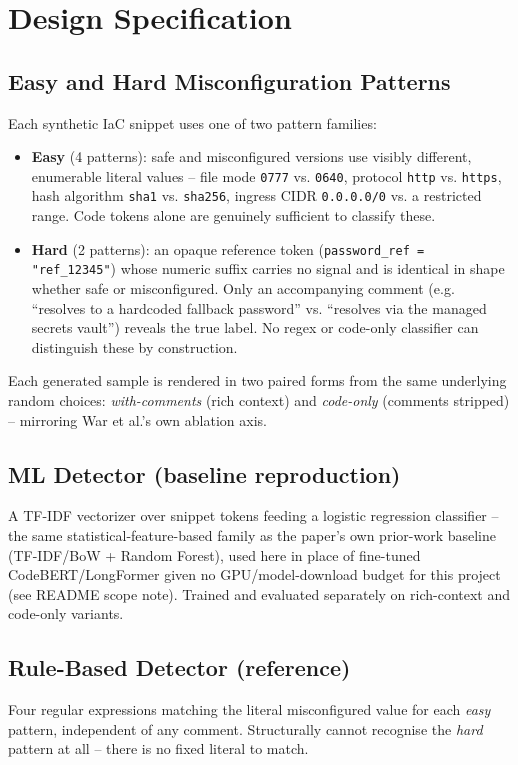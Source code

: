 
\section{Design Specification}
\label{sec:Design}

\subsection{Easy and Hard Misconfiguration Patterns}
Each synthetic IaC snippet uses one of two pattern families:
\begin{itemize}
  \item \textbf{Easy} (4 patterns): safe and misconfigured versions use visibly different, enumerable literal values -- file mode \texttt{0777} vs. \texttt{0640}, protocol \texttt{http} vs. \texttt{https}, hash algorithm \texttt{sha1} vs. \texttt{sha256}, ingress CIDR \texttt{0.0.0.0/0} vs. a restricted range. Code tokens alone are genuinely sufficient to classify these.
  \item \textbf{Hard} (2 patterns): an opaque reference token (\texttt{password\_ref = "ref\_12345"}) whose numeric suffix carries no signal and is identical in shape whether safe or misconfigured. Only an accompanying comment (e.g. ``resolves to a hardcoded fallback password'' vs. ``resolves via the managed secrets vault'') reveals the true label. No regex or code-only classifier can distinguish these by construction.
\end{itemize}
Each generated sample is rendered in two paired forms from the same underlying random choices: \emph{with-comments} (rich context) and \emph{code-only} (comments stripped) -- mirroring War et al.'s own ablation axis.

\subsection{ML Detector (baseline reproduction)}
A TF-IDF vectorizer over snippet tokens feeding a logistic regression classifier -- the same statistical-feature-based family as the paper's own prior-work baseline (TF-IDF/BoW + Random Forest), used here in place of fine-tuned CodeBERT/LongFormer given no GPU/model-download budget for this project (see README scope note). Trained and evaluated separately on rich-context and code-only variants.

\subsection{Rule-Based Detector (reference)}
Four regular expressions matching the literal misconfigured value for each \emph{easy} pattern, independent of any comment. Structurally cannot recognise the \emph{hard} pattern at all -- there is no fixed literal to match.

